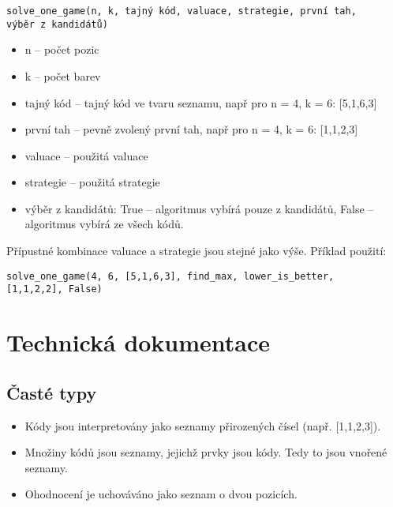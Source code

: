 \documentclass[12pt,a4paper]{article}
\begin{document}
\texttt{solve\_one\_game(n, k, tajný kód, valuace, strategie, první tah,}\\
\texttt{výběr z kandidátů)}
\begin{itemize}
    \item n -- počet pozic
    \item k -- počet barev
    \item tajný kód -- tajný kód ve tvaru seznamu, např pro n = 4, k = 6: [5,1,6,3]
    \item první tah -- pevně zvolený první tah, např pro n = 4, k = 6: [1,1,2,3]
    \item valuace -- použitá valuace
    \item strategie -- použitá strategie
    \item výběr z kandidátů: True -- algoritmus vybírá pouze z kandidátů, 
        False -- algoritmus vybírá ze všech kódů.
\end{itemize}

Přípustné kombinace valuace a strategie jsou stejné jako výše.
Příklad použití:

\texttt{solve\_one\_game(4, 6, [5,1,6,3], find\_max, lower\_is\_better,}\\ \texttt{[1,1,2,2], False)}




\section{Technická dokumentace}
\subsection{Časté typy}
\begin{itemize}
    \item Kódy jsou interpretovány jako seznamy přirozených čísel (např. [1,1,2,3]). 
    \item Množiny kódů jsou seznamy, jejichž prvky jsou kódy. Tedy to jsou vnořené seznamy. 
    \item Ohodnocení je uchováváno jako seznam o dvou pozicích. 
\end{itemize}
\end{document}
